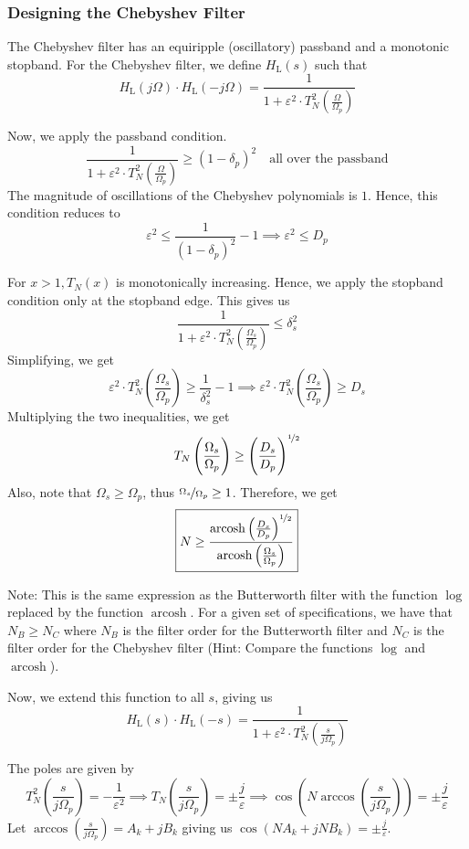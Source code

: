 \documentclass{article}
\theoremstyle{definition}
\DeclareMathOperator{\arccosh}{arcosh}
\newcommand\ddfrac[2]{\frac{\displaystyle #1}{\displaystyle #2}}
\begin{document}
\subsubsection{Designing the Chebyshev Filter}

The Chebyshev filter has an equiripple (oscillatory) passband and a monotonic stopband. For the Chebyshev filter, we define $H_{\text{L}}(s)$ such that
\[
    H_{\text{L}}(j\Omega) \cdot H_{\text{L}}(-j\Omega) = \ddfrac{1}{1 + \varepsilon^2 \cdot T_N^2 \left(\frac{\Omega}{\Omega_p}\right)}
\]  

Now, we apply the passband condition. 
\[
    \ddfrac{1}{1 + \varepsilon^2 \cdot T_N^2 \left(\frac{\Omega}{\Omega_p}\right)} \geq (1-\delta_p)^2 \quad \text{all over the passband}
\]
The magnitude of oscillations of the Chebyshev polynomials is $1$. Hence, this condition reduces to
\[
    \varepsilon^2 \leq \frac{1}{(1-\delta_p)^2} - 1 \implies \boxed{\varepsilon^2 \leq D_p}
\]

For $x > 1, T_N(x)$ is monotonically increasing. Hence, we apply the stopband condition only at the stopband edge. This gives us
\[
    \ddfrac{1}{1 + \varepsilon^2 \cdot T_N^2 \left(\frac{\Omega_s}{\Omega_p}\right)} \leq \delta_s^2
\]
Simplifying, we get
\[
    \varepsilon^2 \cdot T_N^2 \left( \frac{\Omega_s}{\Omega_p} \right) \geq \frac{1}{\delta_s^2} - 1 \implies \boxed{\varepsilon^2 \cdot T_N^2 \left( \frac{\Omega_s}{\Omega_p} \right) \geq D_s}
\]
Multiplying the two inequalities, we get
\[
    T_N \left( \frac{\Omega_s}{\Omega_p} \right) \geq \left( \frac{D_s}{D_p} \right)^{\nicefrac{1}{2}}
\]
Also, note that $\Omega_s \geq \Omega_p$, thus $\nicefrac{\Omega_s}{\Omega_p} \geq 1$. Therefore, we get
\[
    \boxed{N \geq \frac{\arccosh \left( \frac{D_s}{D_p}\right)^{\nicefrac{1}{2}}}{\arccosh \left( \frac{\Omega_s}{\Omega_p}\right)}}
\]

Note: This is the same expression as the Butterworth filter with the function $\log$ replaced by the function $\arccosh$. For a given set of specifications, we have that $N_B \geq N_C$ where $N_B$ is the filter order for the Butterworth filter and $N_C$ is the filter order for the Chebyshev filter (Hint: Compare the functions $\log$ and $\arccosh$). \smallskip

Now, we extend this function to all $s$, giving us
\[
    H_{\text{L}}(s) \cdot H_{\text{L}}(-s) = \ddfrac{1}{1 + \varepsilon^2 \cdot T_N^2 \left(\frac{s}{j \Omega_p}\right)}
\]

The poles are given by
\[
    T_N^2 \left( \frac{s}{j \Omega_p} \right) = - \frac{1}{\varepsilon^2} \implies T_N \left( \frac{s}{j \Omega_p} \right) = \pm \frac{j}{\varepsilon} \implies \cos \left(N \arccos \left( \frac{s}{j \Omega_p} \right) \right) = \pm \frac{j}{\varepsilon}
\]
Let $\arccos \left( \frac{s}{j \Omega_p} \right) = A_k + jB_k$ giving us $\cos(NA_k + jNB_k) = \pm \frac{j}{\varepsilon}$.
\end{document}
